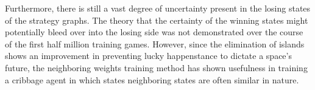 Furthermore,
there is still a vast degree of uncertainty present in the losing states of
the strategy graphs.
%
The theory that the certainty of the winning states might potentially
bleed over into the losing side was not demonstrated over the course of
the first half million training games.
%
However,
since the elimination of islands shows an improvement in
preventing lucky happenstance to dictate a space's future,
the neighboring weights training method has shown usefulness in training a
cribbage agent in which states neighboring states are often similar in nature.

